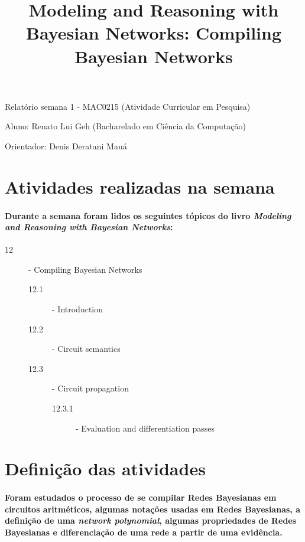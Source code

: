 \documentclass[a4paper,10pt]{article}
\title{\textbf{Modeling and Reasoning with Bayesian Networks: Compiling Bayesian Networks}}
\theoremstyle{plain}
\begin{document}
\date{}
\author{}
\vspace*{-40pt}
{\let\newpage\relax\maketitle}

Relatório semana 1 - MAC0215 (Atividade Curricular em Pesquisa)

Aluno: Renato Lui Geh (Bacharelado em Ciência da Computação)

Orientador: Denis Deratani Mauá

\section{Atividades realizadas na semana}

\paragraph{
  Durante a semana foram lidos os seguintes tópicos do livro \textit{Modeling and Reasoning with
Bayesian Networks}\cite{bayes-net-darwiche}:
}

\begin{description}
  \item[12] - Compiling Bayesian Networks
  \begin{description}
    \item[12.1] - Introduction
    \item[12.2] - Circuit semantics
    \item[12.3] - Circuit propagation
    \begin{description}
      \item[12.3.1] - Evaluation and differentiation passes
    \end{description}
  \end{description}
\end{description}

\section{Definição das atividades}

\paragraph{
  Foram estudados o processo de se compilar Redes Bayesianas em circuitos aritméticos, algumas 
notações usadas em Redes Bayesianas, a definição de uma \textit{network polynomial}, algumas 
propriedades de Redes Bayesianas e diferenciação de uma rede a partir de uma evidência.
}
\end{document}

